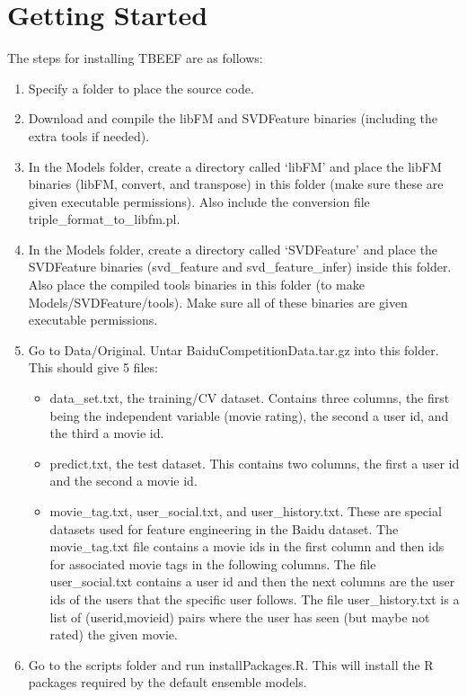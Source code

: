 \documentclass{article}
\begin{document}
\section{Getting Started}

The steps for installing TBEEF are as follows:

\begin{enumerate}
\item Specify a folder to place the source code.
\item Download and compile the libFM and SVDFeature binaries (including the extra tools if needed).
\item In the Models folder, create a directory called `libFM' and place the libFM binaries (libFM, convert, and transpose) in this folder (make sure these are given executable permissions). Also include the conversion file triple\_format\_to\_libfm.pl.
\item In the Models folder, create a directory called `SVDFeature' and place the SVDFeature binaries (svd\_feature and svd\_feature\_infer) inside this folder. Also place the compiled tools binaries in this folder (to make Models/SVDFeature/tools). Make sure all of these binaries are given executable permissions.
\item Go to Data/Original. Untar BaiduCompetitionData.tar.gz into this folder. This should give 5 files: 
\begin{itemize}
\item data\_set.txt, the training/CV dataset. Contains three columns, the first being the independent variable (movie rating), the second a user id, and the third a movie id.
\item predict.txt, the test dataset. This contains two columns, the first a user id and the second a movie id.
\item movie\_tag.txt, user\_social.txt, and user\_history.txt. These are special datasets used for feature engineering in the Baidu dataset. The movie\_tag.txt file contains a movie ids in the first column and then ids for associated movie tags in the following columns. The file user\_social.txt contains a user id and then the next columns are the user ids of the users that the specific user follows. The file user\_history.txt is a list of (userid,movieid) pairs where the user has seen (but maybe not rated) the given movie.
\end{itemize}
\item Go to the scripts folder and run installPackages.R. This will install the R packages required by the default ensemble models.

\end{enumerate}
\end{document}
